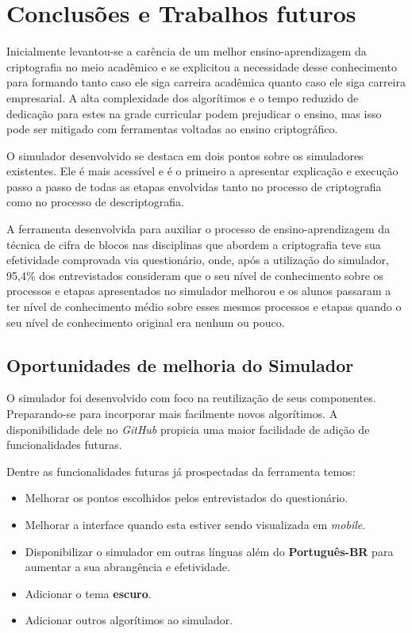 \chapter{Conclusões e Trabalhos futuros}
\label{char:conclusoesetrabfuturos}
Inicialmente levantou-se a carência de um melhor ensino-aprendizagem da criptografia no meio acadêmico e se explicitou a necessidade desse conhecimento para formando tanto caso ele siga carreira acadêmica quanto caso ele siga carreira empresarial. A alta complexidade dos algorítimos e o tempo reduzido de dedicação para estes na grade curricular podem prejudicar o ensino, mas isso pode ser mitigado com ferramentas voltadas ao ensino criptográfico.

O simulador desenvolvido se destaca em dois pontos sobre os simuladores existentes. Ele é mais acessível e é o primeiro a apresentar explicação e execução passo a passo de todas as etapas envolvidas tanto no processo de criptografia como no processo de descriptografia.

A ferramenta desenvolvida para auxiliar o processo de ensino-aprendizagem da técnica de cifra de blocos nas disciplinas que abordem a criptografia teve sua efetividade comprovada via questionário, onde, após a utilização do simulador, 95,4\% dos entrevistados consideram que o seu nível de conhecimento sobre os processos e etapas apresentados no simulador melhorou e os alunos passaram a ter nível de conhecimento médio sobre esses mesmos processos e etapas quando o seu nível de conhecimento original era nenhum ou pouco.

\section{Oportunidades de melhoria do Simulador}
O simulador foi desenvolvido com foco na reutilização de seus componentes. Preparando-se para incorporar mais facilmente novos algorítimos. A disponibilidade dele no \textit{GitHub} propicia uma maior facilidade de adição de funcionalidades futuras.

Dentre as funcionalidades futuras já prospectadas da ferramenta temos:

\begin{itemize}
    \item Melhorar os pontos escolhidos pelos entrevistados do questionário.
    \item Melhorar a interface quando esta estiver sendo visualizada em \textit{mobile}.
    \item Disponibilizar o simulador em outras línguas além do \textbf{Português-BR} para aumentar a sua abrangência e efetividade.
    \item Adicionar o tema \textbf{escuro}.
    \item Adicionar outros algorítimos ao simulador.
\end{itemize}
